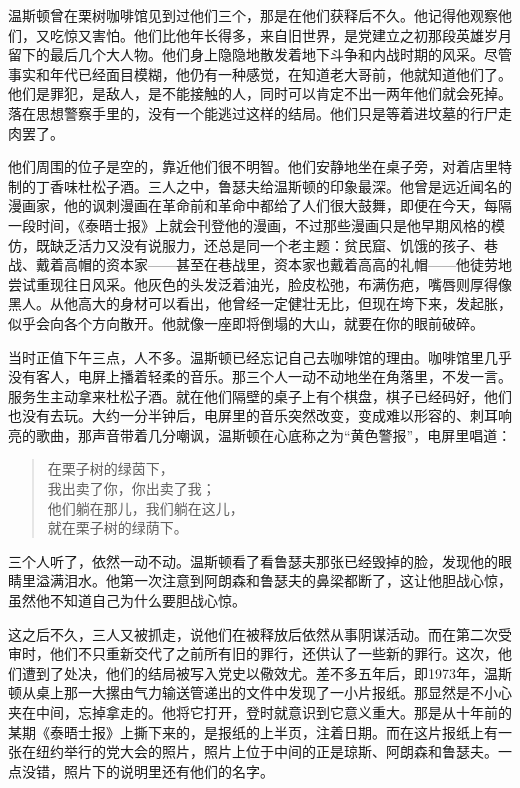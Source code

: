温斯顿曾在栗树咖啡馆见到过他们三个，那是在他们获释后不久。他记得他观察他们，又吃惊又害怕。他们比他年长得多，来自旧世界，是党建立之初那段英雄岁月留下的最后几个大人物。他们身上隐隐地散发着地下斗争和内战时期的风采。尽管事实和年代已经面目模糊，他仍有一种感觉，在知道老大哥前，他就知道他们了。他们是罪犯，是敌人，是不能接触的人，同时可以肯定不出一两年他们就会死掉。落在思想警察手里的，没有一个能逃过这样的结局。他们只是等着进坟墓的行尸走肉罢了。

他们周围的位子是空的，靠近他们很不明智。他们安静地坐在桌子旁，对着店里特制的丁香味杜松子酒。三人之中，鲁瑟夫给温斯顿的印象最深。他曾是远近闻名的漫画家，他的讽刺漫画在革命前和革命中都给了人们很大鼓舞，即便在今天，每隔一段时间，《泰晤士报》上就会刊登他的漫画，不过那些漫画只是他早期风格的模仿，既缺乏活力又没有说服力，还总是同一个老主题：贫民窟、饥饿的孩子、巷战、戴着高帽的资本家——甚至在巷战里，资本家也戴着高高的礼帽——他徒劳地尝试重现往日风采。他灰色的头发泛着油光，脸皮松弛，布满伤疤，嘴唇则厚得像黑人。从他高大的身材可以看出，他曾经一定健壮无比，但现在垮下来，发起胀，似乎会向各个方向散开。他就像一座即将倒塌的大山，就要在你的眼前破碎。

当时正值下午三点，人不多。温斯顿已经忘记自己去咖啡馆的理由。咖啡馆里几乎没有客人，电屏上播着轻柔的音乐。那三个人一动不动地坐在角落里，不发一言。服务生主动拿来杜松子酒。就在他们隔壁的桌子上有个棋盘，棋子已经码好，他们也没有去玩。大约一分半钟后，电屏里的音乐突然改变，变成难以形容的、刺耳响亮的歌曲，那声音带着几分嘲讽，温斯顿在心底称之为``黄色警报''，电屏里唱道：

\begin{quotation}
\noindent 在栗子树的绿茵下，\\
我出卖了你，你出卖了我；\\
他们躺在那儿，我们躺在这儿，\\
就在栗子树的绿荫下。
\end{quotation}

三个人听了，依然一动不动。温斯顿看了看鲁瑟夫那张已经毁掉的脸，发现他的眼睛里溢满泪水。他第一次注意到阿朗森和鲁瑟夫的鼻梁都断了，这让他胆战心惊，虽然他不知道自己为什么要胆战心惊。

这之后不久，三人又被抓走，说他们在被释放后依然从事阴谋活动。而在第二次受审时，他们不只重新交代了之前所有旧的罪行，还供认了一些新的罪行。这次，他们遭到了处决，他们的结局被写入党史以儆效尤。差不多五年后，即1973年，温斯顿从桌上那一大摞由气力输送管递出的文件中发现了一小片报纸。那显然是不小心夹在中间，忘掉拿走的。他将它打开，登时就意识到它意义重大。那是从十年前的某期《泰晤士报》上撕下来的，是报纸的上半页，注着日期。而在这片报纸上有一张在纽约举行的党大会的照片，照片上位于中间的正是琼斯、阿朗森和鲁瑟夫。一点没错，照片下的说明里还有他们的名字。

